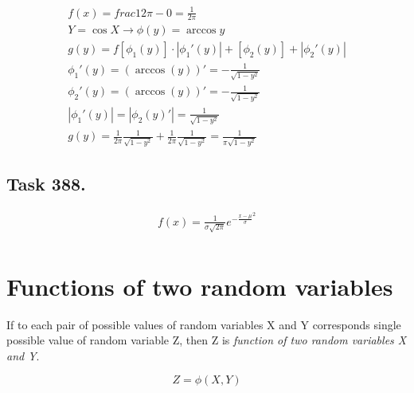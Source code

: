 \documentclass{article}
\begin{document}
\begin{fleqn}[1\parindent]
  \begin{gather*}
    f(x) = frac{1}{2\pi-0}=\frac{1}{2\pi} \\
    Y=\cos{X} \rightarrow \phi(y) = \arccos{y} \\ 
    g(y) = f[\phi_1(y)]\cdot|\phi_1'(y)|+[\phi_2(y)]+|\phi_2'(y)| \\
    \phi_1'(y)=(\arccos(y))'=-\frac{1}{\sqrt{1-y^2}} \\
    \phi_2'(y)=(\arccos(y))'=-\frac{1}{\sqrt{1-y^2}} \\
    |\phi_1'(y)|=|\phi_2(y)'|=\frac{1}{\sqrt{1-y^2}} \\ 
    g(y) = \frac{1}{2\pi}\frac{1}{\sqrt{1-y^2}}+\frac{1}{2\pi}\frac{1}{\sqrt{1-y^2}}=\frac{1}{\pi\sqrt{1-y^2}}
  \end{gather*}
\end{fleqn}

\subsection*{Task 388.}

\begin{fleqn}[1\parindent]
  \begin{gather*}
    f(x)=\frac{1}{\sigma\sqrt{2\pi}}e^{-\frac{x-\mu}{\sigma}^2} \\
  \end{gather*}
\end{fleqn}

\section*{Functions of two random variables}

If to each pair of possible values of random variables X and Y corresponds single possible value of random variable Z,
then Z is \textit{function of two random variables X and Y}.

\begin{equation*}
  Z = \phi(X,Y)
\end{equation*}
\end{document}
